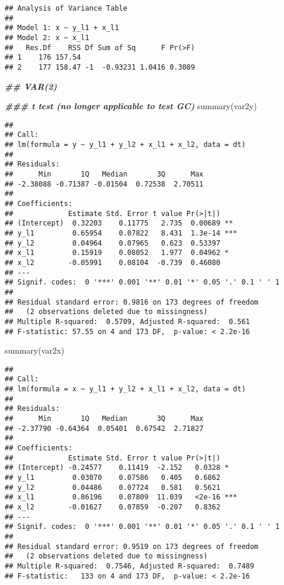 \documentclass[
  oneside]{book}
\newenvironment{Shaded}{\begin{snugshade}}{\end{snugshade}}
\newcommand{\DocumentationTok}[1]{\textcolor[rgb]{0.56,0.35,0.01}{\textbf{\textit{#1}}}}
\newcommand{\FunctionTok}[1]{\textcolor[rgb]{0.00,0.00,0.00}{#1}}
\newcommand{\NormalTok}[1]{#1}
\begin{document}
\begin{verbatim}
## Analysis of Variance Table
## 
## Model 1: x ~ y_l1 + x_l1
## Model 2: x ~ x_l1
##   Res.Df    RSS Df Sum of Sq      F Pr(>F)
## 1    176 157.54                           
## 2    177 158.47 -1  -0.93231 1.0416 0.3089
\end{verbatim}

\begin{Shaded}
\begin{Highlighting}[]
\DocumentationTok{\#\# VAR(2)}

\DocumentationTok{\#\#\# t test (no longer applicable to test GC)}
\FunctionTok{summary}\NormalTok{(var2y)}
\end{Highlighting}
\end{Shaded}

\begin{verbatim}
## 
## Call:
## lm(formula = y ~ y_l1 + y_l2 + x_l1 + x_l2, data = dt)
## 
## Residuals:
##      Min       1Q   Median       3Q      Max 
## -2.38088 -0.71387 -0.01504  0.72538  2.70511 
## 
## Coefficients:
##             Estimate Std. Error t value Pr(>|t|)    
## (Intercept)  0.32203    0.11775   2.735  0.00689 ** 
## y_l1         0.65954    0.07822   8.431  1.3e-14 ***
## y_l2         0.04964    0.07965   0.623  0.53397    
## x_l1         0.15919    0.08052   1.977  0.04962 *  
## x_l2        -0.05991    0.08104  -0.739  0.46080    
## ---
## Signif. codes:  0 '***' 0.001 '**' 0.01 '*' 0.05 '.' 0.1 ' ' 1
## 
## Residual standard error: 0.9816 on 173 degrees of freedom
##   (2 observations deleted due to missingness)
## Multiple R-squared:  0.5709, Adjusted R-squared:  0.561 
## F-statistic: 57.55 on 4 and 173 DF,  p-value: < 2.2e-16
\end{verbatim}

\begin{Shaded}
\begin{Highlighting}[]
\FunctionTok{summary}\NormalTok{(var2x)}
\end{Highlighting}
\end{Shaded}

\begin{verbatim}
## 
## Call:
## lm(formula = x ~ y_l1 + y_l2 + x_l1 + x_l2, data = dt)
## 
## Residuals:
##      Min       1Q   Median       3Q      Max 
## -2.37790 -0.64364  0.05401  0.67542  2.71827 
## 
## Coefficients:
##             Estimate Std. Error t value Pr(>|t|)    
## (Intercept) -0.24577    0.11419  -2.152   0.0328 *  
## y_l1         0.03070    0.07586   0.405   0.6862    
## y_l2         0.04486    0.07724   0.581   0.5621    
## x_l1         0.86196    0.07809  11.039   <2e-16 ***
## x_l2        -0.01627    0.07859  -0.207   0.8362    
## ---
## Signif. codes:  0 '***' 0.001 '**' 0.01 '*' 0.05 '.' 0.1 ' ' 1
## 
## Residual standard error: 0.9519 on 173 degrees of freedom
##   (2 observations deleted due to missingness)
## Multiple R-squared:  0.7546, Adjusted R-squared:  0.7489 
## F-statistic:   133 on 4 and 173 DF,  p-value: < 2.2e-16
\end{verbatim}
\end{document}
